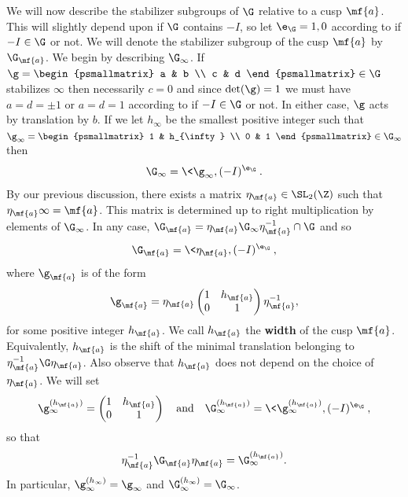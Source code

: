 \documentclass[12pt]{article}
\begin{document}
      We will now describe the stabilizer subgroups of \(\G\) relative to a cusp \(\mf{a}\). This will slightly depend upon if \(\G\) contains \(-I\), so let \(\e_{\G} = 1,0\) according to if \(-I \in \G\) or not. We will denote the stabilizer subgroup of the cusp \(\mf{a}\) by \(\G_{\mf{a}}\). We begin by describing \(\G_{\infty}\). If \(\g = \begin{psmallmatrix} a & b \\ c & d \end{psmallmatrix} \in \G\) stabilizes \(\infty\) then necessarily \(c = 0\) and since \(\det(\g) = 1\) we must have \(a = d = \pm 1\) or \(a = d = 1\) according to if \(-I \in \G\) or not. In either case, \(\g\) acts by translation by \(b\). If we let \(h_{\infty}\) be the smallest positive integer such that \(\g_{\infty} = \begin{psmallmatrix} 1 & h_{\infty} \\ 0 & 1 \end{psmallmatrix} \in \G_{\infty}\) then
      \[
        \G_{\infty} = \<\g_{\infty},(-I)^{\e_{\G}}\>.
      \]
      By our previous discussion, there exists a matrix \(\eta_{\mf{a}} \in \SL_{2}(\Z)\) such that \(\eta_{\mf{a}}\infty = \mf{a}\). This matrix is determined up to right multiplication by elements of \(\G_{\infty}\). In any case, \(\G_{\mf{a}} = \eta_{\mf{a}}\G_{\infty}\eta_{\mf{a}}^{-1} \cap \G\) and so
      \[
        \G_{\mf{a}} = \<\eta_{\mf{a}},(-I)^{\e_{\G}}\>,
      \]
      where \(\g_{\mf{a}}\) is of the form
      \[
        \g_{\mf{a}} = \eta_{\mf{a}}\begin{pmatrix} 1 & h_{\mf{a}} \\ 0 & 1 \end{pmatrix}\eta_{\mf{a}}^{-1},
      \]
      for some positive integer \(h_{\mf{a}}\). We call \(h_{\mf{a}}\) the \textbf{width} of the cusp \(\mf{a}\). Equivalently, \(h_{\mf{a}}\) is the shift of the minimal translation belonging to \(\eta_{\mf{a}}^{-1}\G\eta_{\mf{a}}\). Also observe that \(h_{\mf{a}}\) does not depend on the choice of \(\eta_{\mf{a}}\). We will set
      \[
        \g_{\infty}^{(h_{\mf{a}})} = \begin{pmatrix} 1 & h_{\mf{a}} \\ 0 & 1 \end{pmatrix} \quad \text{and} \quad \G_{\infty}^{(h_{\mf{a}})} = \<\g_{\infty}^{(h_{\mf{a}})},(-I)^{\e_{\G}}\>,
      \]
      so that
      \[
        \eta_{\mf{a}}^{-1}\G_{\mf{a}}\eta_{\mf{a}} = \G_{\infty}^{(h_{\mf{a}})}.
      \]
      In particular, \(\g_{\infty}^{(h_{\infty})} = \g_{\infty}\) and \(\G_{\infty}^{(h_{\infty})} = \G_{\infty}\).
\end{document}
